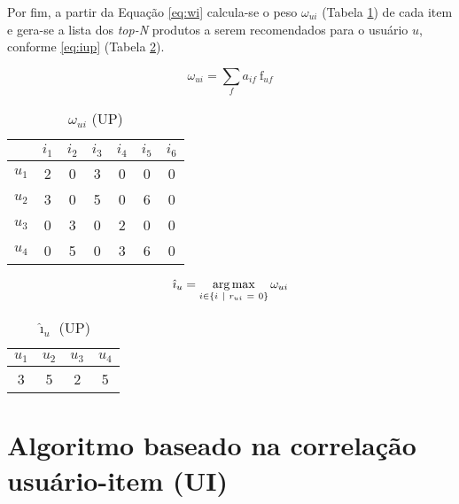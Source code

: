 Por fim, a partir da Equação \ref{eq:wi} calcula-se o peso $\omega_{ui}$ (Tabela \ref{tab:omega_ui}) de cada item e gera-se a lista dos \textit{top-N} produtos a serem recomendados para o usuário $u$, conforme \ref{eq:iup} (Tabela \ref{tab:i_u}). 

\begin{equation}
\label{eq:wi} 
    \omega_{ui} = \sum_{f}{a_{if}~\mathrm{f}_{uf}}
\end{equation} 


\begin{table}[p]
\begin{center}
    \caption{$\omega_{ui}$ (UP)}
    \label{tab:omega_ui}
    \begin{tabular}{ | c | c | c | c | c | c | c | } 
    \hline
     & $i_1$ & $i_2$ & $i_3$ & $i_4$ & $i_5$ & $i_6$ \\ \hline
     $u_1$ & 2 & 0 & 3 & 0 & 0 & 0 \\ \hline
     $u_2$ & 3 & 0 & 5 & 0 & 6 & 0 \\ \hline
     $u_3$ & 0 & 3 & 0 & 2 & 0 & 0 \\ \hline
     $u_4$ & 0 & 5 & 0 & 3 & 6 & 0 \\ \hline
    \end{tabular}
\end{center}
\end{table}

\begin{equation}
\label{eq:iup} 
    \hat{\imath}_u = \operatorname*{arg\,max}_{i \in \left\{i~|~r_{ui}~=~0\right\}}{\omega_{ui}}
\end{equation} 

\begin{table}[p]
\begin{center}
    \caption{$\hat{\imath}_u$ (UP)}
    \label{tab:i_u}
    \begin{tabular}{ | c | c | c | c | } 
    \hline
     $u_1$ & $u_2$ & $u_3$ & $u_4$   \\ \hline
     3 & 5 & 2 & 5  \\ \hline
    \end{tabular}
\end{center}
\end{table}

\section{Algoritmo baseado na correlação usuário-item (UI)} %
\label{sec:algoritmo_baseado_na_correla_o_usu_rio_item_ui_}

